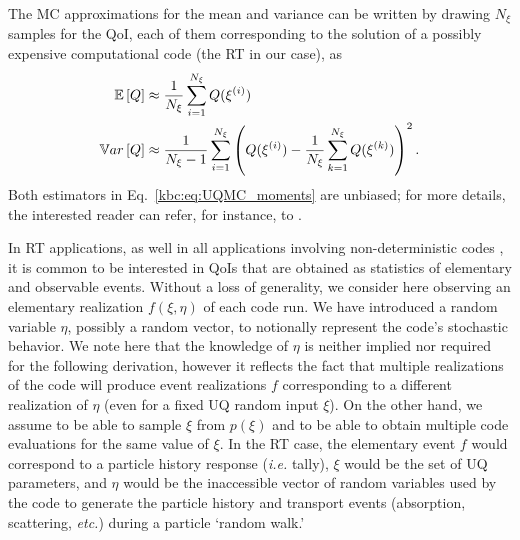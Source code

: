 The MC approximations for the mean and variance can be written by drawing $N_\xi$ samples for the QoI, each of them corresponding to the solution of a possibly expensive computational code (the RT in our case), as
\begin{equation}
\label{kbc:eq:UQMC_moments}
 \begin{split}
 \mathbb{E}\left[Q\right] &\approx \frac{1}{N_\xi} \sum_{i=1}^{N_\xi} Q( \xi^{(i)} )  \\
 \mathbb{V}ar\left[Q\right] &\approx \frac{1}{N_\xi-1} \sum_{i=1}^{N_\xi} \left( Q( \xi^{(i)} ) - \frac{1}{N_\xi} \sum_{k=1}^{N_\xi} Q( \xi^{(k)} )                             
                                                       \right)^2.
 \end{split}
\end{equation}
Both estimators in Eq.~\eqref{kbc:eq:UQMC_moments} are unbiased; for more details, the interested reader can refer, for instance, to \cite{kbc:Owen}.  

In RT applications, as well in all applications involving non-deterministic codes \cite{kbc:GeraciUSNCCM21}, it is common to be interested in QoIs that are obtained as statistics of elementary and observable events. Without a loss of generality, we consider here observing an elementary realization $f(\xi,\eta)$ of each code run. We have introduced a random variable $\eta$, possibly a random vector, to notionally represent the code's stochastic behavior. We note here that the knowledge of $\eta$ is neither implied nor required for the following derivation, however it reflects the fact that multiple realizations of the code will produce event realizations $f$ corresponding to a different realization of $\eta$ (even for a fixed UQ random input $\xi$). On the other hand, we assume to be able to sample $\xi$ from $p(\xi)$ and to be able to obtain multiple code evaluations for the same value of $\xi$. In the RT case, the elementary event $f$ would correspond to a particle history response (\textit{i.e.} tally), $\xi$ would be the set of UQ parameters, and $\eta$ would be the inaccessible vector of random variables used by the code to generate the particle history and transport events (absorption, scattering, \emph{etc.}) during a particle `random walk.'  

